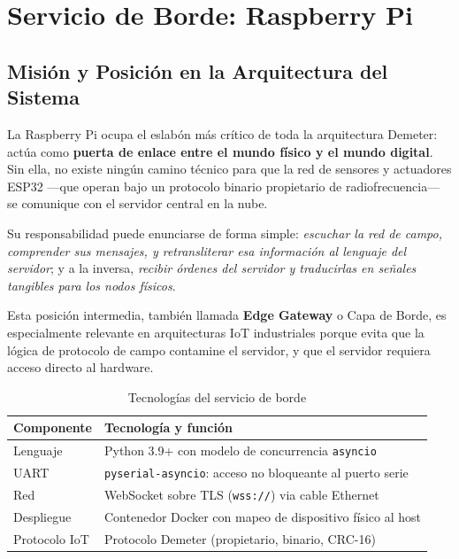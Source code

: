 \chapter{Servicio de Borde: Raspberry Pi}
\label{sec:raspberry}

\section{Misión y Posición en la Arquitectura del Sistema}

La Raspberry Pi ocupa el eslabón más crítico de toda la arquitectura Demeter: actúa como
\textbf{puerta de enlace entre el mundo físico y el mundo digital}. Sin ella, no existe ningún 
camino técnico para que la red de sensores y actuadores ESP32 ---que operan bajo un protocolo 
binario propietario de radiofrecuencia--- se comunique con el servidor central en la nube.

Su responsabilidad puede enunciarse de forma simple: \textit{escuchar la red de campo, 
comprender sus mensajes, y retransliterar esa información al lenguaje del servidor}; y 
a la inversa, \textit{recibir órdenes del servidor y traducirlas en señales tangibles para 
los nodos físicos}.

Esta posición intermedia, también llamada \textbf{Edge Gateway} o Capa de Borde, es 
especialmente relevante en arquitecturas IoT industriales porque evita que la lógica de 
protocolo de campo contamine el servidor, y que el servidor requiera acceso directo al hardware.

\begin{table}[H]
    \centering
    \caption{Tecnologías del servicio de borde}
    \begin{tabular}{lp{9cm}}
        \toprule
        \textbf{Componente} & \textbf{Tecnología y función} \\
        \midrule
        Lenguaje       & Python 3.9+ con modelo de concurrencia \texttt{asyncio} \\
        UART           & \texttt{pyserial-asyncio}: acceso no bloqueante al puerto serie \\
        Red            & WebSocket sobre TLS (\texttt{wss://}) via cable Ethernet \\
        Despliegue     & Contenedor Docker con mapeo de dispositivo físico al host \\
        Protocolo IoT  & Protocolo Demeter (propietario, binario, CRC-16) \\
        \bottomrule
    \end{tabular}
    \label{tab:rpi_techs}
\end{table}


